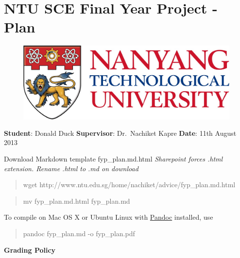 \section{NTU SCE Final Year Project - Plan}

\begin{figure}[htbp]
\centering
\includegraphics{ntu.jpg}
\end{figure}

\textbf{Student}: Donald Duck \textbf{Supervisor}:
Dr.~Nachiket Kapre \textbf{Date}: 11th August 2013

Download Markdown template fyp\_plan.md.html
\emph{Sharepoint forces .html extension. Rename .html to .md
on download}

\begin{quote}
wget
http://www.ntu.edu.sg/home/nachiket/advice/fyp\_plan.md.html
\end{quote}

\begin{quote}
mv fyp\_plan.md.html fyp\_plan.md
\end{quote}

To compile on Mac OS X or Ubuntu Linux with
\href{http://johnmacfarlane.net/pandoc}{Pandoc} installed,
use

\begin{quote}
pandoc fyp\_plan.md -o fyp\_plan.pdf
\end{quote}

\textbf{Grading Policy}

